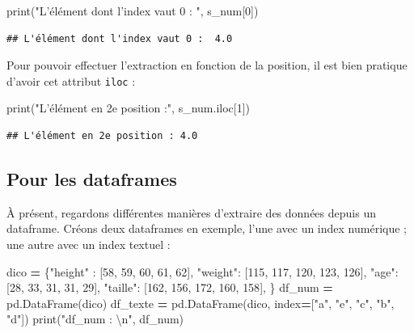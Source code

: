 \documentclass[12pt,]{book}
\newenvironment{Shaded}{\begin{snugshade}}{\end{snugshade}}
\newcommand{\DecValTok}[1]{\textcolor[rgb]{0.00,0.00,0.81}{#1}}
\newcommand{\CharTok}[1]{\textcolor[rgb]{0.31,0.60,0.02}{#1}}
\newcommand{\StringTok}[1]{\textcolor[rgb]{0.31,0.60,0.02}{#1}}
\newcommand{\OperatorTok}[1]{\textcolor[rgb]{0.81,0.36,0.00}{\textbf{#1}}}
\newcommand{\BuiltInTok}[1]{#1}
\newcommand{\NormalTok}[1]{#1}
\numberwithin{equation}{section}
\numberwithin{countremarque}{section}
\begin{document}
\begin{Shaded}
\begin{Highlighting}[]
\BuiltInTok{print}\NormalTok{(}\StringTok{"L'élément dont l'index vaut 0 : "}\NormalTok{, s_num[}\DecValTok{0}\NormalTok{])}
\end{Highlighting}
\end{Shaded}

\begin{lstlisting}
## L'élément dont l'index vaut 0 :  4.0
\end{lstlisting}

Pour pouvoir effectuer l'extraction en fonction de la position, il est
bien pratique d'avoir cet attribut \texttt{iloc} :

\begin{Shaded}
\begin{Highlighting}[]
\BuiltInTok{print}\NormalTok{(}\StringTok{"L'élément en 2e position :"}\NormalTok{, s_num.iloc[}\DecValTok{1}\NormalTok{])}
\end{Highlighting}
\end{Shaded}

\begin{lstlisting}
## L'élément en 2e position : 4.0
\end{lstlisting}

\subsection{Pour les dataframes}\label{pour-les-dataframes}

À présent, regardons différentes manières d'extraire des données depuis
un dataframe. Créons deux dataframes en exemple, l'une avec un index
numérique ; une autre avec un index textuel :

\begin{Shaded}
\begin{Highlighting}[]
\NormalTok{dico }\OperatorTok{=}\NormalTok{ \{}\StringTok{"height"}\NormalTok{ : [}\DecValTok{58}\NormalTok{, }\DecValTok{59}\NormalTok{, }\DecValTok{60}\NormalTok{, }\DecValTok{61}\NormalTok{, }\DecValTok{62}\NormalTok{],}
        \StringTok{"weight"}\NormalTok{: [}\DecValTok{115}\NormalTok{, }\DecValTok{117}\NormalTok{, }\DecValTok{120}\NormalTok{, }\DecValTok{123}\NormalTok{, }\DecValTok{126}\NormalTok{],}
        \StringTok{"age"}\NormalTok{: [}\DecValTok{28}\NormalTok{, }\DecValTok{33}\NormalTok{, }\DecValTok{31}\NormalTok{, }\DecValTok{31}\NormalTok{, }\DecValTok{29}\NormalTok{],}
        \StringTok{"taille"}\NormalTok{: [}\DecValTok{162}\NormalTok{, }\DecValTok{156}\NormalTok{, }\DecValTok{172}\NormalTok{, }\DecValTok{160}\NormalTok{, }\DecValTok{158}\NormalTok{],}
\NormalTok{       \} }
\NormalTok{df_num }\OperatorTok{=}\NormalTok{ pd.DataFrame(dico)}
\NormalTok{df_texte }\OperatorTok{=}\NormalTok{ pd.DataFrame(dico, index}\OperatorTok{=}\NormalTok{[}\StringTok{"a"}\NormalTok{, }\StringTok{"e"}\NormalTok{, }\StringTok{"c"}\NormalTok{, }\StringTok{"b"}\NormalTok{, }\StringTok{"d"}\NormalTok{])}
\BuiltInTok{print}\NormalTok{(}\StringTok{"df_num : }\CharTok{\textbackslash{}n}\StringTok{"}\NormalTok{, df_num)}
\end{Highlighting}
\end{Shaded}
\end{document}
